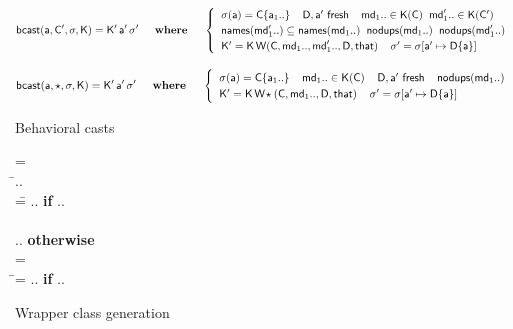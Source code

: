 \documentclass[acmsmall, anonymous, authordraft, review]{acmart} %
\begin{document}
\begin{figure}[!b]
\hrulefill
\small

\vspace{-4mm}

\begin{equation*}
  \behcastE\a\Cp\s\K \Kp\ap\sp \HS\HS\WHERE\HS\HS \begin{cases}
\HS  \App\s\a = \obj\C{\a[1]..} \HS\HS
  \fresh{\D,\ap} \HS\HS
  \md[1].. \In \App\K\C \HS \mdp[1].. \In \App\K\Cp \\\HS
  \names{\mdp[1]..} \subseteq \names{\md[1]..} \HS \cload{\md[1]..} \HS \cload{\mdp[1]..} \\\HS
  \Kp = \K\,\wrap\C{\md[1]..}{\mdp[1]..}\D\that \HS\HS
  \sp = \Map \s{\Bind\ap{\obj\D{\a}}} 
  \end{cases}
\end{equation*}

\begin{equation*}
  \behcastE\a\any\s\K \Kp\ap\sp  \HS\HS\WHERE\HS\HS\begin{cases}\HS
  \App\s\a = \obj\C{\a[1]..} \HS\HS \md[1].. \In \App\K\C \HS\HS
  \fresh{\D,\ap} \HS\HS \cload{\md[1]..} \\\HS
  \Kp = \K\,\wrapAny\C{\md[1]..}\D\that \HS\HS
  \sp = \Map \s{\Bind\ap{\obj\D{\a}}} 
\end{cases}\end{equation*}


\hrulefill
\vspace{-2mm}\caption{Behavioral casts}\label{behavetext}
\end{figure}

\begin{figure}[!t]
\hrulefill
\small

\begin{tabbing}\small
  \wrap{}\D\that = \\
  \HS\HS\WHERE\HS\= \Mdef\m\x{\t[1]}{\t[2]}\e\In\md[1].. \\
                 \> \mdpp[1] =\= \src{\Mdef\m\x{\tp[1]}{\tp[2]}{~\BehCast{\tp[2]}{\KCall{\FRead\that}\m{\bscast{\tp[1]}\x}{\t[1]}{\t[2]}}}} ..
    \HS \= \textbf{if} \HS \Mdef\m\x{\tp[1]}{\tp[2]}\ep\In\mdp[1].. \\
\\[-3mm]
\> \>  \src{\Mdef\m\x{\t[1]}{\t[2]}{~\KCall{\FRead\that}\m{\x}{\t[1]}{\t[2]}}} ..  \>\textbf{otherwise}
\\[3mm]
   = \\
\HS\HS\WHERE\HS\=\mdp[1] = \src{ \Mdef\m\x{\any}{\any}{~\BehCast\any{ \KCall{\FRead\that} \m {\bscast{\t}\x}{\t}{\tp}} } }   ..
    \HS\HS\HS\HS \= \textbf{if} \HS \Mdef\m\x{\t}{\tp}\e\In\md[1].. \\
\end{tabbing}

\vspace{-5mm}

\hrulefill
\vspace{-2mm}
\caption{Wrapper class generation}\label{w}\end{figure}
\end{document}

